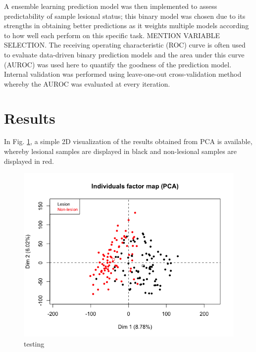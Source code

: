 \documentclass[journal, a4paper]{IEEEtran}
\begin{document}
A ensemble learning prediction model was then implemented to assess predictability of sample lesional status; this binary model was chosen due to its strengths in obtaining better predictions as it weights multiple models according to how well each perform on this specific task\cite{friedman2001elements}. MENTION VARIABLE SELECTION. The receiving operating characteristic (ROC) curve is often used to evaluate data-driven binary prediction models and the area under this curve (AUROC) was used here to quantify the goodness of the prediction model\cite{hanley1982meaning}. Internal validation was performed using leave-one-out cross-validation method whereby the AUROC was evaluated at every iteration\cite{efron1994introduction}. %


\section{Results}


In Fig. \ref{fig:pca}, a simple 2D visualization of the results obtained from PCA is available, whereby lesional samples are displayed in black and non-lesional samples are displayed in red.

\begin{figure}[!htp]
    \begin{center}
    \begin{minipage}{0.5 \textwidth}
      \centering
      \includegraphics[width=\textwidth]{../exploratory-data-analysis/pca-plot.png}
      \caption{testing}
      \label{fig:pca}
    \end{minipage}
  \end{center}
\end{figure}
\end{document}
